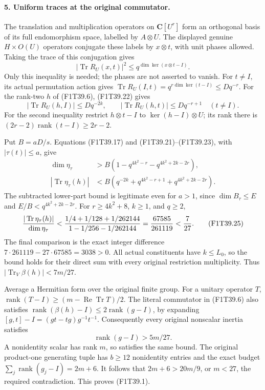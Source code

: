 \paragraph{5. Uniform traces at the original commutator.}
The translation and multiplication operators on
\(\mathbf C[U^r]\) form an orthogonal basis of its full
endomorphism space, labelled by \(A\otimes U\).
The displayed genuine \(H\times O(U)\) operators
conjugate these labels by \(x\otimes t\), with unit
phases allowed. Taking the trace of this conjugation gives
\[
 |\operatorname{Tr}R_U(x,t)|^2
 \le q^{\dim\ker(x\otimes t-I)}.
 \tag{F1T39.22}
\]
Only this inequality is needed; the phases are not
asserted to vanish. For \(t\ne I\), its actual
permutation action gives
\(\operatorname{Tr}R_U(I,t)=q^{r\dim\ker(t-I)}\le Dq^{-r}\).
For the rank-two \(h\) of (F1T39.6), (F1T39.22) gives
\[
 |\operatorname{Tr}R_U(h,I)|\le Dq^{-2k},\qquad
 |\operatorname{Tr}R_U(h,t)|\le Dq^{-r+1}\quad(t\ne I).
 \tag{F1T39.23}
\]
For the second inequality restrict \(h\otimes t-I\)
to \(\ker(h-I)\otimes U\); its rank there is
\((2r-2)\operatorname{rank}(t-I)\ge2r-2\).

Put \(B=aD/s\). Equations (F1T39.17) and
(F1T39.21)--(F1T39.23), with \(|\tau(t)|\le a\), give
\[
\begin{split}
 \dim\eta_\tau&>
 B\left(1-q^{4k^2-r}-q^{4k^2+2k-2r}\right),\\
 |\operatorname{Tr}\eta_\tau(h)|&<
 B\left(q^{-2k}+q^{4k^2-r+1}+q^{4k^2+2k-2r}\right).
\end{split}
 \tag{F1T39.24}
\]
The subtracted lower-part bound is legitimate even for
\(a>1\), since \(\dim B_\tau\le E\) and
\(E/B<q^{4k^2+2k-2r}\).
For \(r\ge4k^2+8\), \(k\ge1\), and \(q\ge2\),
\[
 { |\operatorname{Tr}\eta_\tau(h)|\over\dim\eta_\tau}
 < {1/4+1/128+1/262144\over1-1/256-1/262144}
 = {67585\over261119}< {7\over27}.
 \tag{F1T39.25}
\]
The final comparison is the exact integer difference
\(7\cdot261119-27\cdot67585=3038>0\).
All actual constituents have \(k\le L_0\), so the
bound holds for their direct sum with every original
restriction multiplicity. Thus
\(|\operatorname{Tr}_V\beta(h)|<7m/27\).

Average a Hermitian form over the original finite group.
For a unitary operator \(T\),
\(\operatorname{rank}(T-I)\ge(m-\operatorname{Re}\operatorname{Tr}T)/2\).
The literal commutator in (F1T39.6) also satisfies
\(\operatorname{rank}(\beta(h)-I)\le2\operatorname{rank}(g-I)\),
by expanding \([g,t]-I=(gt-tg)g^{-1}t^{-1}\).
Consequently every original nonscalar inertia satisfies
\[
                   \operatorname{rank}(g-I)>5m/27.
 \tag{F1T39.26}
\]
A nonidentity scalar has rank \(m\), so satisfies the
same bound. The original product-one generating tuple
has \(b\ge12\) nonidentity entries and the exact budget
\(\sum_j\operatorname{rank}(g_j-I)=2m+6\).
It follows that \(2m+6>20m/9\), or \(m<27\), the
required contradiction. This proves (F1T39.1).

